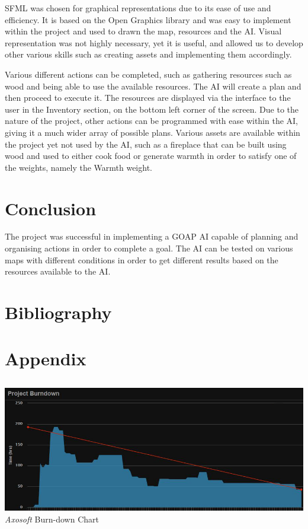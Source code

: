 \documentclass[a4paper]{report}
\begin{document}
SFML was chosen for graphical representations due to its ease of use and efficiency. It is based on the Open Graphics library and was easy to implement within the project and used to drawn the map, resources and the AI. Visual representation was not highly necessary, yet it is useful, and allowed us to develop other various skills such as creating assets and implementing them accordingly.

Various different actions can be completed, such as gathering resources such as wood and being able to use the available resources. The AI will create a plan and then proceed to execute it. The resources are displayed via the interface to the user in the Inventory section, on the bottom left corner of the screen. Due to the nature of the project, other actions can be programmed with ease within the AI, giving it a much wider array of possible plans. Various assets are available within the project yet not used by the AI, such as a fireplace that can be built using wood and used to either cook food or generate warmth in order to satisfy one of the weights, namely the Warmth weight.

\chapter{Conclusion}
The project was successful in implementing a GOAP AI capable of planning and organising actions in order to complete a goal. The AI can be tested on various maps with different conditions in order to get different results based on the resources available to the AI. 


\chapter{Bibliography}
\appendix
\chapter{Appendix}
\section{}
\subsection{}
	\includegraphics[width=1.0\linewidth]{./appendixImages/AxosoftScreenShot01}
	\textit{Axosoft} Burn-down Chart 
\end{document}
